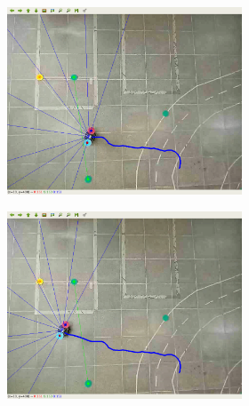 \begin{figure}[H]
\begin{center}
\begin{subfigure}[b]{0.60\textwidth}
        \begin{subfigure}[b]{0.24\textwidth}
            \includegraphics[width=\textwidth]{imagens/real_envs/real_env1_ddpg/5.png}
        \end{subfigure}
        \hfill
        \begin{subfigure}[b]{0.24\textwidth}
            \includegraphics[width=\textwidth]{imagens/real_envs/real_env1_ddpg/6.png}
        \end{subfigure}
        \hfill
        \begin{subfigure}[b]{0.24\textwidth}

\end{subfigure}
\end{subfigure}
\end{center}
\end{figure}
